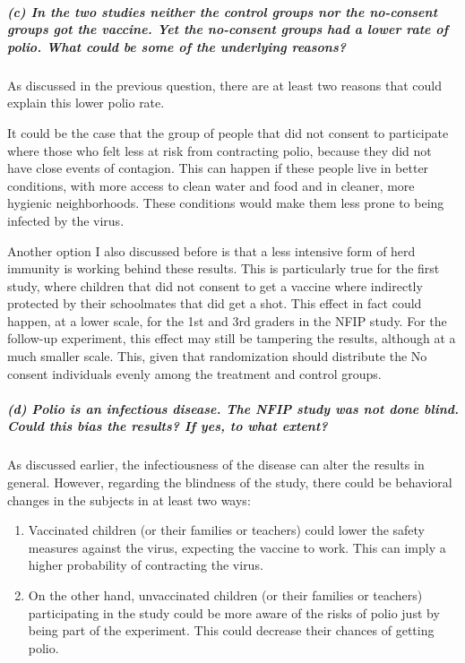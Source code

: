 \documentclass[11pt, english]{article}
\begin{document}
    \hypertarget{c-in-the-two-studies-neither-the-control-groups-nor-the-no-consent-groups-got-the-vaccine.-yet-the-no-consent-groups-had-a-lower-rate-of-polio.-what-could-be-some-of-the-underlying-reasons}{%
\subparagraph{(c) In the two studies neither the control groups nor the
no-consent groups got the vaccine. Yet the no-consent groups had a lower
rate of polio. What could be some of the underlying
reasons?\\[2ex]}\label{c-in-the-two-studies-neither-the-control-groups-nor-the-no-consent-groups-got-the-vaccine.-yet-the-no-consent-groups-had-a-lower-rate-of-polio.-what-could-be-some-of-the-underlying-reasons}}

    As discussed in the previous question, there are at least two reasons
that could explain this lower polio rate.

It could be the case that the group of people that did not consent to
participate where those who felt less at risk from contracting polio,
because they did not have close events of contagion. This can happen if
these people live in better conditions, with more access to clean water
and food and in cleaner, more hygienic neighborhoods. These conditions
would make them less prone to being infected by the virus.

Another option I also discussed before is that a less intensive form of
herd immunity is working behind these results. This is particularly true
for the first study, where children that did not consent to get a
vaccine where indirectly protected by their schoolmates that did get a
shot. This effect in fact could happen, at a lower scale, for the 1st
and 3rd graders in the NFIP study. For the follow-up experiment, this
effect may still be tampering the results, although at a much smaller
scale. This, given that randomization should distribute the No consent
individuals evenly among the treatment and control groups.

    \hypertarget{d-polio-is-an-infectious-disease.-the-nfip-study-was-not-done-blind.-could-this-bias-the-results-if-yes-to-what-extent}{%
\subparagraph{(d) Polio is an infectious disease. The NFIP study was not
done blind. Could this bias the results? If yes, to what
extent?\\[2ex]}\label{d-polio-is-an-infectious-disease.-the-nfip-study-was-not-done-blind.-could-this-bias-the-results-if-yes-to-what-extent}}

    As discussed earlier, the infectiousness of the disease can alter the
results in general. However, regarding the blindness of the study, there
could be behavioral changes in the subjects in at least two ways:
\begin{enumerate}
\item Vaccinated children (or their families or teachers) could lower the
safety measures against the virus, expecting the vaccine to work. This
can imply a higher probability of contracting the virus.

\item On the other hand, unvaccinated children (or their families or teachers)
participating in the study could be more aware of the risks of polio
just by being part of the experiment. This could decrease their chances
of getting polio.
\end{enumerate}
\end{document}
